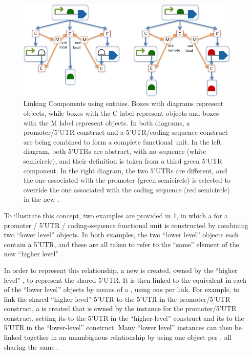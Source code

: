 \begin{figure}[ht]
\begin{center}
\includegraphics[scale=1]{images/MapsTo_Diagram2}
\caption{Linking Components using  entities. Boxes with diagrams represent  objects, while boxes with the C label represent  objects and boxes with the M label represent  objects.  In both diagrams, a promoter/5'UTR construct and a 5'UTR/coding sequence construct are being combined to form a complete functional unit.  
In the left diagram, both 5'UTRs are abstract, with no sequence (white semicircle), and their definition is taken from a third green 5'UTR component. In the right diagram, the two 5'UTRs are different, and the one associated with the promoter (green semicircle) is selected to override the one associated with the coding sequence (red semicircle) in the new .}
\label{image:maps_to_diagram2}
\end{center}
\end{figure}

To illustrate this concept, two examples are provided in \ref{image:maps_to_diagram2}, in which a  for a promoter / 5'UTR / coding-sequence functional unit is constructed by combining two ``lower level''  objects.
In both examples, the two ``lower level''  objects each contain a 5'UTR, and these are all taken to refer to the ``same'' element of the new ``higher level'' .

In order to represent this relationship, a new  is created, owned by the ``higher level'' , to represent the shared 5'UTR.  
It is then linked to the equivalent  in each of the ``lower level''  objects by means of a , using one  per link.  
For example, to link the shared ``higher level'' 5'UTR to the 5'UTR in the promoter/5'UTR construct, a  is created that is owned by the  instance for the promoter/5'UTR construct, setting its  to the 5'UTR  in the ``higher-level'' construct and its  to the 5'UTR  in the ``lower-level'' construct.
Many ``lower level'' instances can then be linked together in an unambiguous relationship by using one  object per , all sharing the same .

